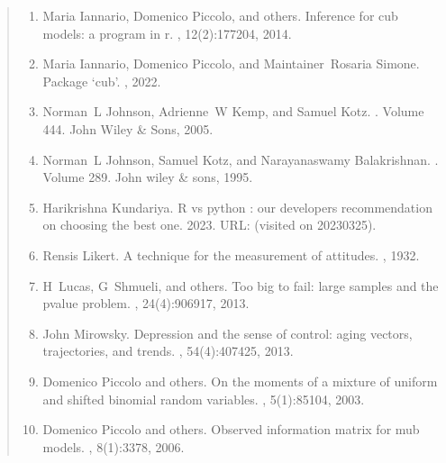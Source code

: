 \documentclass[letterpaper,10pt,english]{sphinxmanual}
\begin{document}
\begin{quote}
\begin{enumerate}
\item {} 
\sphinxAtStartPar
Maria Iannario, Domenico Piccolo, and others. Inference for cub models: a program in r. , 12(2):177\textendash{}204, 2014.

\item {} 
\sphinxAtStartPar
Maria Iannario, Domenico Piccolo, and Maintainer Rosaria Simone. Package ‘cub’. , 2022.

\item {} 
\sphinxAtStartPar
Norman L Johnson, Adrienne W Kemp, and Samuel Kotz. . Volume 444. John Wiley \& Sons, 2005.

\item {} 
\sphinxAtStartPar
Norman L Johnson, Samuel Kotz, and Narayanaswamy Balakrishnan. . Volume 289. John wiley \& sons, 1995.

\item {} 
\sphinxAtStartPar
Harikrishna Kundariya. R vs python : our developers recommendation on choosing the best one. 2023. URL:  (visited on 2023\sphinxhyphen{}03\sphinxhyphen{}25).

\item {} 
\sphinxAtStartPar
Rensis Likert. A technique for the measurement of attitudes. , 1932.

\item {} 
\sphinxAtStartPar
H Lucas, G Shmueli, and others. Too big to fail: large samples and the p\sphinxhyphen{}value problem. , 24(4):906\textendash{}917, 2013.

\item {} 
\sphinxAtStartPar
John Mirowsky. Depression and the sense of control: aging vectors, trajectories, and trends. , 54(4):407\textendash{}425, 2013.

\item {} 
\sphinxAtStartPar
Domenico Piccolo and others. On the moments of a mixture of uniform and shifted binomial random variables. , 5(1):85\textendash{}104, 2003.

\item {} 
\sphinxAtStartPar
Domenico Piccolo and others. Observed information matrix for mub models. , 8(1):33\textendash{}78, 2006.


\end{enumerate}
\end{quote}
\end{document}

